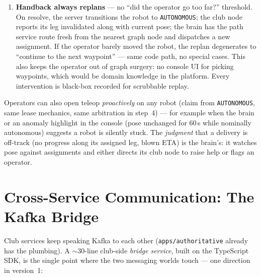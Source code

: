 \documentclass[11pt]{article}
\begin{document}
\begin{enumerate}[itemsep=1pt]
        consoles are heartbeated presence clients like everything else; if the
        operator's presence lapses or the lease goes unrenewed, the server revokes
        the lease and returns the robot to \texttt{HELP\_REQUESTED} --- back in the
        queue for the next operator. The robot's role during the gap is to fail safe
        (the deadman has already stopped it) and to report media-link loss as
        telemetry; it never re-queues itself off peer-to-peer state. The asymmetry
        matters because the WebRTC path can die while the operator's WSS is healthy
        (a TURN hiccup): if the robot decided for itself, one robot could hold a live
        lease \emph{and} sit in the queue --- exactly the two-drivers ambiguity
        leases exist to kill.
  \item \textbf{Handback always replans} --- no ``did the operator go too far?''
        threshold. On resolve, the server transitions the robot to
        \texttt{AUTONOMOUS}; the club node reports its leg invalidated along with
        current pose; the brain has the path service route fresh from the nearest
        graph node and dispatches a new assignment. If the operator barely moved the
        robot, the replan degenerates to ``continue to the next waypoint'' --- same
        code path, no special cases. This also keeps the operator out of graph
        surgery: no console UI for picking waypoints, which would be domain knowledge
        in the platform. Every intervention is black-box recorded for scrubbable
        replay.
\end{enumerate}

Operators can also open teleop \emph{proactively} on any robot (claim from
\texttt{AUTONOMOUS}, same lease mechanics, same arbitration in step~4) --- for
example when the brain or an anomaly
highlight in the console (pose unchanged for 60\,s while nominally autonomous) suggests
a robot is silently stuck. The \emph{judgment} that a delivery is off-track (no
progress along its assigned leg, blown ETA) is the brain's: it watches pose against
assignments and either directs its club node to raise help or flags an operator.

\section{Cross-Service Communication: The Kafka Bridge}

Club services keep speaking Kafka to each other (\texttt{apps/authoritative} already
has the plumbing). A $\sim$30-line club-side \emph{bridge service}, built on the
TypeScript SDK, is the single point where the two messaging worlds touch --- one
direction in version~1:
\end{document}
